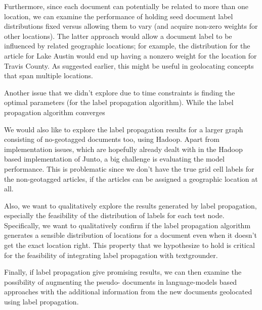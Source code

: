  
\par Furthermore, since each document can potentially be related to more than
one location, we can examine the performance of holding seed document label
distributions fixed versus allowing them to vary (and acquire non-zero weights
for other locations). The latter approach would allow a document label to be
influenced by related geographic locations;  for example, the distribution for
the article for Lake Austin would end up having a nonzero weight for the
location for Travis County. As suggested earlier, this might be useful in
geolocating concepts that span multiple locations.


\par Another issue that we didn't explore due to time constraints is finding the optimal parameters (for the label propagation algorithm). While the label propagation algorithm converges

\par We would also like to explore the label propagation results for a larger graph consisting of no-geotagged documents too, using
Hadoop. Apart from implementation issues, which are hopefully already dealt with in the Hadoop based implementation of Junto, a big challenge is evaluating the model performance. This is problematic since we don't have the true grid cell labels for the non-geotagged articles, if the articles can be assigned a geographic location at all.

\par Also, we want to qualitatively explore the results generated by label propagation, especially the feasibility  of the distribution of labels for each test node. Specifically, we want to qualitatively confirm if the label propagation algorithm generates a sensible distribution of locations for a document even when it doesn't get the exact location right. This property that we hypothesize to hold is critical for the feasibility of integrating label propagation with textgrounder.

\par Finally, if label propagation
give promising results, we can then examine the possibility of augmenting the
pseudo- documents in language-models based approaches with the additional
information from the new documents geolocated using label propagation.

